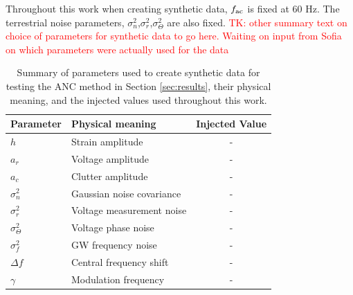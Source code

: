 \documentclass[pra,superscriptaddress,reprint,amsmath,amssymb,nofootinbib]{revtex4-2}
\begin{document}
Throughout this work when creating synthetic data, $f_{\rm ac}$ is fixed at 60 Hz. The terrestrial noise parameters, $\sigma_n^2$,$\sigma_r^2$,$\sigma_{\Theta}^2$ are also fixed. \textcolor{red}{TK: other summary text on choice of parameters for synthetic data to go here. Waiting on input from Sofia on which parameters were actually used for the data}
\begin{table}[bp]
	
	\begin{tabular}{llc}
		\hline 
		
		Parameter & Physical meaning & Injected Value \\
		\hline
		$h$  &    Strain amplitude & - \\ 
		$a_r$ & Voltage amplitude &- \\
		$a_c$ & Clutter amplitude &- \\

		
		$\sigma_n^2$ & Gaussian noise covariance&- \\
		$\sigma_r^2$  & Voltage measurement noise & -\\
		$\sigma_{\Theta}^2$ & Voltage phase noise  &-\\
		$\sigma^2_f$ &  GW frequency noise & -\\
		
		$\Delta f$ &  Central frequency shift  &-\\
		$\gamma$ & Modulation frequency& - \\
		\hline
		
	\end{tabular} 
	
	\caption{Summary of parameters used to create synthetic data for testing the ANC method in Section \ref{sec:results}, their physical meaning, and the injected values used throughout this work.}
	\label{tab:parameterdescription2}
\end{table}
\end{document}
